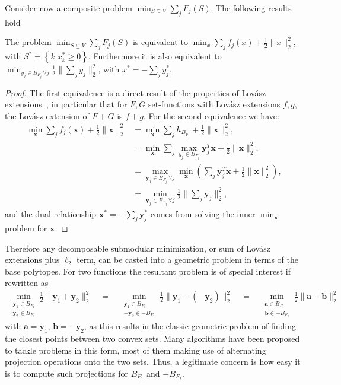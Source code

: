 \documentclass[twoside,11pt]{article}
\newcommand{\va}{\bm{a}}       \newcommand{\vah}{\hat{\bm{a}}}        \newcommand{\ah}{\hat{a}}    \newcommand{\vat}{\tilde{\bm{a}}}       \newcommand{\at}{\tilde{a}}
\newcommand{\vb}{\bm{b}}       \newcommand{\vbh}{\hat{\bm{b}}}        \newcommand{\bh}{\hat{b}}    \newcommand{\vbt}{\tilde{\bm{b}}}       \newcommand{\bt}{\tilde{b}}
\newcommand{\vx}{\bm{x}}       \newcommand{\vxh}{\hat{\bm{x}}}        \newcommand{\xh}{\hat{x}}    \newcommand{\vxt}{\tilde{\bm{x}}}       \newcommand{\xt}{\tilde{x}}
\newcommand{\vy}{\bm{y}}       \newcommand{\vyh}{\hat{\bm{y}}}        \newcommand{\yh}{\hat{y}}    \newcommand{\vyt}{\tilde{\bm{y}}}       \newcommand{\yt}{\tilde{y}}
\newcommand{\mynorm}[2]{\| {#1} \|_{#2}}
\newcommand{\enorm}[1]{\mynorm{#1}{2}}
\newcommand{\half}{\tfrac{1}{2}}
\numberwithin{equation}{section}
\numberwithin{theorem}{section}
\begin{document}
Consider now a composite problem $\min_{S \subseteq V} \sum_j F_j(S)$. The following results hold
\begin{proposition}
 \label{pro:decompsubmodular}
 The problem $\min_{S \subseteq V} \sum_j F_j(S)$ is equivalent to $\min_x \sum_j f_j(x) + \half \enorm{x}^2$, with $S^* = \left\lbrace k | x_k^* \geq 0 \right\rbrace$. Furthermore it is also equivalent to $\min_{y_j \in B_{F_j} \, \forall j} \half \enorm{\sum_j y_j}^2$, with $x^* = -\sum_j y^*_j$.
\end{proposition}
\begin{proof}
  The first equivalence is a direct result of the properties of Lovász extensions~\citep{Bach13}, in particular that for $F, G$ set-functions with Lovász extensions $f, g$, the Lovász extension of $F + G$ is $f + g$. For the second equivalence we have:
  \begin{align*}
   \min_{\vx} \sum_j f_j(\vx) + \half \enorm{\vx}^2 &= \min_{\vx} \sum_j h_{B_{F_j}} + \half \enorm{\vx}^2, \\
   &= \min_{\vx} \sum_j \max_{y_j \in B_{F_j}} \vy_j^T \vx + \half \enorm{\vx}^2, \\
   &= \max_{\vy_j \in B_{F_j} \, \forall j} \min_{\vx} \left( \sum_j \vy_j^T \vx + \half \enorm{\vx}^2 \right), \\
   &= \min_{\vy_j \in B_{F_j} \, \forall j} \half \enorm{\sum_j \vy_j}^2,
  \end{align*}
  and the dual relationship $\vx^* = -\sum_j \vy^*_j$ comes from solving the inner $\min_{\vx}$ problem for $\vx$.
\end{proof}
Therefore any decomposable submodular minimization, or sum of Lovász extensions plus $\ell_2$ term, can be casted into a geometric problem in terms of the base polytopes. For two functions the resultant problem is of special interest if rewritten as
\begin{align*}
 \min_{\substack{\vy_1 \in B_{F_1} \\ \vy_2 \in B_{F_2}}} \half \enorm{\vy_1 + \vy_2}^2 \quad = \quad
 \min_{\substack{\vy_1 \in B_{F_1} \\ -\vy_2 \in -B_{F_2}}} \half \enorm{\vy_1 - (-\vy_2)}^2 \quad = \quad
 \min_{\substack{\va \in B_{F_1} \\ \vb \in -B_{F_2}}} \half \enorm{\va -\vb}^2
\end{align*}
with $\va = \vy_1$, $\vb = -\vy_2$, as this results in the classic geometric problem of finding the closest points between two convex sets. Many algorithms have been proposed to tackle problems in this form, most of them making use of alternating projection operations onto the two sets. Thus, a legitimate concern is how easy it is to compute such projections for $B_{F_1}$ and $-B_{F_2}$.
\end{document}
